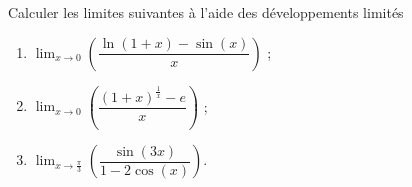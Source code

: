 
\begin{exercice}\label{exoautoanalyseCTU-51}

 Calculer les limites suivantes à l'aide des développements limités
 \begin{multicols}{3}
   \begin{enumerate}
   \item $\displaystyle \lim_{x\to 0}\left(\dfrac{\ln(1+x)-\sin (x)}{x}\right)$ ;
   \item $\displaystyle \lim_{x\to 0}\left(\dfrac{(1+x)^{\frac{1}{x}}-e}{x}\right)$ ; 
   \item $\displaystyle \lim_{x\to \frac{\pi}{3}}\left(\dfrac{\sin (3x)}{1-2\cos (x)}\right)$.
   \end{enumerate}
 \end{multicols}



\end{exercice}
